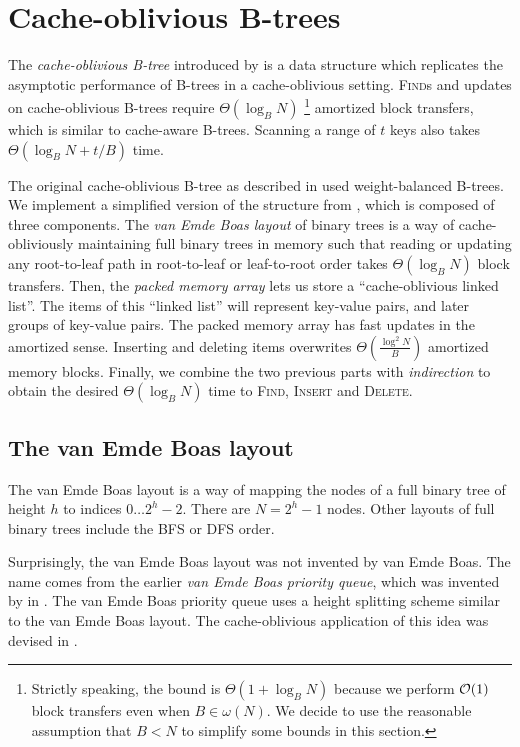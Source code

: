 \chapter{Cache-oblivious B-trees}
\label{chapter:cob}
The \emph{cache-oblivious B-tree} introduced by \cite{cobt}
is a data structure which replicates the asymptotic performance of B-trees
in a cache-oblivious setting.
\textsc{Find}s and updates on cache-oblivious B-trees require $\Theta(\log_B N)$
\footnote{Strictly speaking, the bound is $\Theta(1+\log_B N)$
	because we perform $\mathcal{O}(1)$ block transfers even when $B\in\omega(N)$.
	We decide to use the reasonable assumption that
	$B<N$ to simplify some bounds in this section.}
amortized block transfers, which is similar to cache-aware B-trees.
Scanning a range of $t$ keys also takes $\Theta(\log_B N+t/B)$ time.

The original cache-oblivious B-tree as described in \cite{cobt} used
weight-balanced B-trees. We implement a simplified version of the structure
from \cite{brodal01}, which is composed of three components.
The \emph{van Emde Boas layout} of binary trees is a way of cache-obliviously
maintaining full binary trees in memory such that reading or updating any
root-to-leaf path in root-to-leaf or leaf-to-root order takes $\Theta(\log_B N)$
block transfers.
Then, the \emph{packed memory array} lets us store a ``cache-oblivious linked
list''. The items of this ``linked list'' will represent key-value pairs,
and later groups of key-value pairs.
The packed memory array has fast updates in the amortized sense. Inserting
and deleting items overwrites $\Theta(\frac{\log^2 N}{B})$ amortized memory
blocks.
Finally, we combine the two previous parts with \emph{indirection} to obtain
the desired $\Theta(\log_B N)$ time to \textsc{Find}, \textsc{Insert} and
\textsc{Delete}.

\section{The van Emde Boas layout}
The van Emde Boas layout is a way of mapping the nodes of a full binary
tree of height $h$ to indices $0\ldots 2^h-2$. There are $N=2^h-1$ nodes.
Other layouts of full binary trees include the BFS or DFS order.

Surprisingly, the van Emde Boas layout was not invented by van Emde Boas.
The name comes from the earlier \emph{van Emde Boas priority queue},
which was invented by \citeauthor{van-emde-boas} in \citeyear{van-emde-boas}.
The van Emde Boas priority queue uses a height splitting scheme similar
to the van Emde Boas layout. The cache-oblivious application of this idea
was devised in \cite{veb-layout}.

